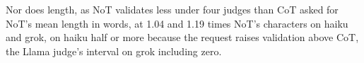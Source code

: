 Nor does length, as NoT validates less under four judges than CoT asked for
NoT's mean length in words, at 1.04 and 1.19 times NoT's characters on
haiku and grok, on haiku half or more because the request raises validation
above CoT, the Llama judge's interval on grok including zero.
